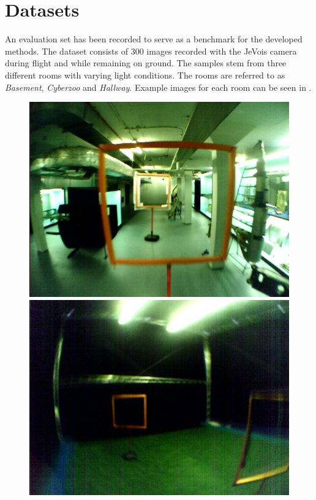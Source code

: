 \section{Datasets}
\label{sec:datasets}
An evaluation set has been recorded to serve as a benchmark for the developed methods. The dataset consists of 300 images recorded with the JeVois camera during flight and while remaining on ground. The samples stem from three different rooms with varying light conditions. The rooms are referred to as \textit{Basement}, \textit{Cyberzoo} and \textit{Hallway}. Example images for each room can be seen in .
\begin{figure}
	\centering
	\begin{minipage}{0.3\textwidth}
		\includegraphics[width=\textwidth]{fig/basement}
	\end{minipage}\hfill
	\begin{minipage}{0.3\textwidth}
	\includegraphics[width=\textwidth]{fig/cyberzoo}

\end{minipage}
\end{figure}
